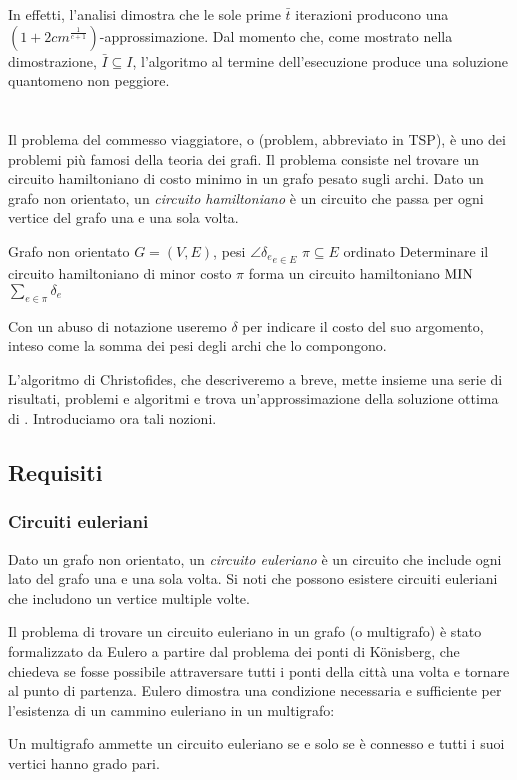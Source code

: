 In effetti, l'analisi dimostra che le sole prime $\bar t$ iterazioni producono una $(1+2cm^{\frac{1}{c+1}})$-approssimazione. Dal momento che, come mostrato nella dimostrazione, $\bar I\subseteq I$, l'algoritmo al termine dell'esecuzione produce una soluzione quantomeno non peggiore.



\section{\TravelingSalesman}
Il problema del commesso viaggiatore, o \TravelingSalesman (problem, abbreviato in TSP), è uno dei problemi più famosi della teoria dei grafi.
Il problema consiste nel trovare un circuito hamiltoniano di costo minimo in un grafo pesato sugli archi.
Dato un grafo non orientato, un \emph{circuito hamiltoniano} è un circuito che passa per ogni vertice del grafo una e una sola volta.

\popt{\TravelingSalesman}
{Grafo non orientato $G=(V,E)$, pesi $\angle{\delta_e}_{e\in E}$}
{$\pi\subseteq E$ ordinato}
{Determinare il circuito hamiltoniano di minor costo}
{$\pi$ forma un circuito hamiltoniano}
{$\mathrm{MIN}$}
{$\sum_{e\in\pi} \delta_e$}

Con un abuso di notazione useremo $\delta$ per indicare il costo del suo argomento, inteso come la somma dei pesi degli archi che lo compongono.

L'algoritmo di Christofides, che descriveremo a breve, mette insieme una serie di risultati, problemi e algoritmi e trova un'approssimazione della soluzione ottima di \TravelingSalesman. Introduciamo ora tali nozioni.


\subsection{Requisiti}

\subsubsection{Circuiti euleriani}
Dato un grafo non orientato, un \emph{circuito euleriano} è un circuito che include ogni lato del grafo una e una sola volta. Si noti che possono esistere circuiti euleriani che includono un vertice multiple volte.

Il problema di trovare un circuito euleriano in un grafo (o multigrafo) è stato formalizzato da Eulero a partire dal problema dei ponti di Könisberg, che chiedeva se fosse possibile attraversare tutti i ponti della città una volta e tornare al punto di partenza.
Eulero dimostra una condizione necessaria e sufficiente per l'esistenza di un cammino euleriano in un multigrafo:
\begin{theorem}[di Eulero]\label{thm:eulero}
	Un multigrafo ammette un circuito euleriano se e solo se è connesso e tutti i suoi vertici hanno grado pari.
\end{theorem}

